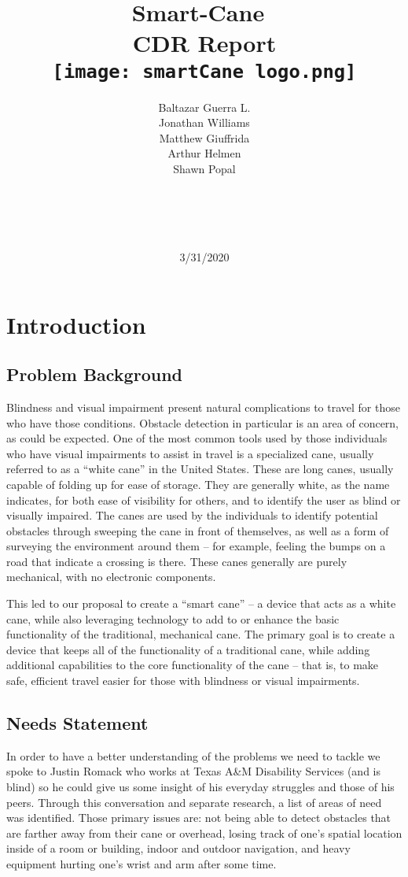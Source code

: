 \documentclass[letterpaper,12pt]{article}
\title{\textbf{\Huge Smart-Cane}\ \\ \textbf{\Huge CDR Report} \\ \texttt{[image: smartCane logo.png]}\\ }
\author{Baltazar Guerra L.\\ Jonathan Williams \\ Matthew Giuffrida \\ Arthur Helmen \\ Shawn Popal \\ \\ \\ \\ \\}
\date{3/31/2020}
\begin{document}
\maketitle
\newpage
\tableofcontents
\newpage

\section{Introduction}
\subsection{Problem Background}

Blindness and visual impairment present natural complications to travel for those who have those conditions. Obstacle detection in particular is an area of concern, as could be expected. One of the most common tools used by those individuals who have visual impairments to assist in travel is a specialized cane, usually referred to as a “white cane” in the United States. These are long canes, usually capable of folding up for ease of storage. They are generally white, as the name indicates, for both ease of visibility for others, and to identify the user as blind or visually impaired. The canes are used by the individuals to identify potential obstacles through sweeping the cane in front of themselves, as well as a form of surveying the environment around them – for example, feeling the bumps on a road that indicate a crossing is there. These canes generally are purely mechanical, with no electronic components. \par

This led to our proposal to create a “smart cane” – a device that acts as a white cane, while also leveraging technology to add to or enhance the basic functionality of the traditional, mechanical cane. The primary goal is to create a device that keeps all of the functionality of a traditional cane, while adding additional capabilities to the core functionality of the cane – that is, to make safe, efficient travel easier for those with blindness or visual impairments. \par

\subsection{Needs Statement}
In order to have a better understanding of the problems we need to tackle we spoke to Justin Romack who works at Texas A\&M Disability Services (and is blind) so he could give us some insight of his everyday struggles and those of his peers. Through this conversation and separate research, a list of areas of need was identified. Those primary issues are: not being able to detect obstacles that are farther away from their cane or overhead, losing track of one’s spatial location inside of a room or building, indoor and outdoor navigation, and heavy equipment hurting one’s wrist and arm after some time.
\end{document}

